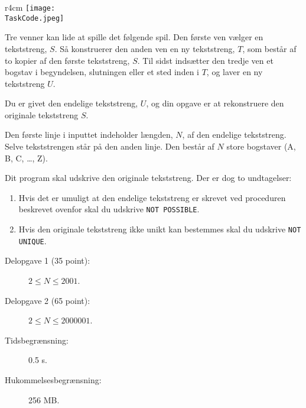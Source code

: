 \documentclass{boi2014-dk}
\renewcommand{\TaskCode}{friends}
\begin{document}
    \begin{wrapfigure}{r}{4cm}
        \vspace{-24pt}
		\texttt{[image: \\TaskCode.jpeg]}
	\end{wrapfigure}
	Tre venner kan lide at spille det følgende spil.
	Den første ven vælger en tekststreng, $S$.
	Så konstruerer den anden ven en ny tekststreng, $T$, som
	består af to kopier af den første tekststreng, $S$.
	Til sidst indsætter den tredje ven et bogstav i begyndelsen, slutningen
    eller et sted inden i $T$, og laver en ny tekststreng $U$.

    \Task
    Du er givet den endelige tekststreng, $U$, og din
    opgave er at rekonstruere den originale tekststreng $S$.

    \Input
    Den første linje i inputtet indeholder længden, $N$, af den
    endelige tekststreng.
	Selve tekststrengen står på den anden linje.
    Den består af $N$ store bogstaver (A, B, C, \ldots, Z).

    \Output
	Dit program skal udskrive den originale tekststreng.
	Der er dog to undtagelser:
    \begin{enumerate}
    	\item Hvis det er umuligt at den endelige tekststreng er
    	skrevet ved proceduren beskrevet ovenfor skal du udskrive
    	 {\tt NOT POSSIBLE}.
    	\item Hvis den originale tekststreng ikke unikt kan bestemmes
    	skal du udskrive {\tt NOT UNIQUE}.
    \end{enumerate}


    \Examples


    \Scoring

    \begin{description}
        \item[Delopgave 1 (35 point):] $2 \le N \le 2001$.
        \item[Delopgave 2 (65 point):] $2 \le N \le 2000001$.
    \end{description}

    \Constraints

    \begin{description}
        \item[Tidsbegrænsning:] 0.5 s.
        \item[Hukommelsesbegrænsning:] 256 MB.
    \end{description}
\end{document}
